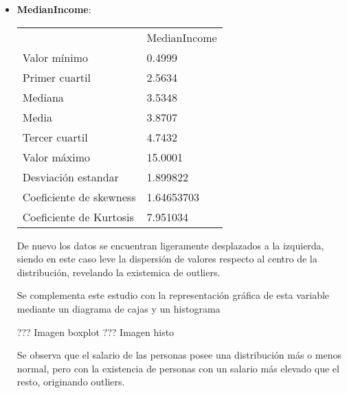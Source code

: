 {\begin{itemize}
Los resultados estadísticos hacen referencia a una distribución desplazada a la izquierda con una amplia dispersión de los datos respecto al centro de distribución de estos, muy probable la existencia de outliers situados a la derecha.

Se complementa este estudio con la representación gráfica de esta variable mediante un diagrama de cajas y un histograma

??? Imagen boxplot
??? Imagen histo

	
	\item \textbf{MedianIncome}: 
	\begin{table}[]
		\begin{tabular}{ll}
			& MedianIncome \\
			Valor mínimo            & 0.4999       \\
			Primer cuartil          & 2.5634       \\
			Mediana                 & 3.5348       \\
			Media                   & 3.8707       \\
			Tercer cuartil          & 4.7432       \\
			Valor máximo            & 15.0001      \\ \hline
			Desviación estandar     & 1.899822     \\ \hline
			Coeficiente de skewness & 1.64653703   \\
			Coeficiente de Kurtosis & 7.951034    
		\end{tabular}
	\end{table}

De nuevo los datos se encuentran ligeramente desplazados a la izquierda, siendo en este caso leve la dispersión de valores respecto al centro de la distribución, revelando la existemica de outliers.

Se complementa este estudio con la representación gráfica de esta variable mediante un diagrama de cajas y un histograma

??? Imagen boxplot
??? Imagen histo


Se observa que el salario de las personas posee una distribución más o menos normal, pero con la existencia de personas con un salario más elevado que el resto, originando outliers.


	
\end{itemize}




}
